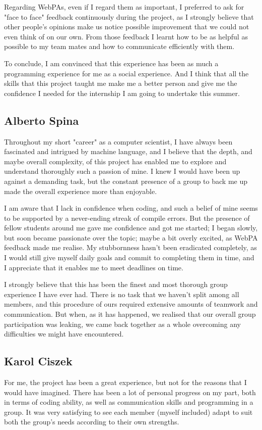 \documentclass[11pt]{article}
\begin{document}
Regarding WebPAs, even if I regard them as important, I preferred to ask for "face to face" feedback continuously during the project, as I strongly believe that other people's opinions make us notice possible improvement that we could not even think of on our own. From those feedback I learnt how to be as helpful as possible to my team mates and how to communicate efficiently with them.

To conclude, I am convinced that this experience has been as much a programming experience for me as a social experience. And I think that all the skills that this project taught me make me a better person and give me the confidence I needed for the internship I am going to undertake this summer.

\subsection{Alberto Spina}
Throughout my short "career" as a computer scientist, I have always been fascinated and intrigued by machine language, and I believe that the depth, and maybe overall complexity, of this project has enabled me to explore and understand thoroughly such a passion of mine. I knew I would have been up against a demanding task, but the constant presence of a group to back me up made the overall experience more than enjoyable.

I am aware that I lack in confidence when coding, and such a belief of mine seems to be supported by a never-ending streak of compile errors. But the presence of fellow students around me gave me confidence and got me started; I began slowly, but soon became passionate over the topic; maybe a bit overly excited, as WebPA feedback made me realise. My stubbornness hasn't been eradicated completely, as I would still give myself daily goals and commit to completing them in time, and I appreciate that it enables me to meet deadlines on time. 

I strongly believe that this has been the finest and most thorough group experience I have ever had. There is no task that we haven't split among all members, and this procedure of ours required extensive amounts of teamwork and communication. But when, as it has happened, we realised that our overall group participation was leaking, we came back together as a whole overcoming any difficulties we might have encountered.

\subsection{Karol Ciszek}
For me, the project has been a great experience, but not for the reasons that I would have imagined. There has been a lot of personal progress on my part, both in terms of coding ability, as well as communication skills and programming in a group. It was very satisfying to see each member (myself included) adapt to suit both the group's needs according to their own strengths.
\end{document}
